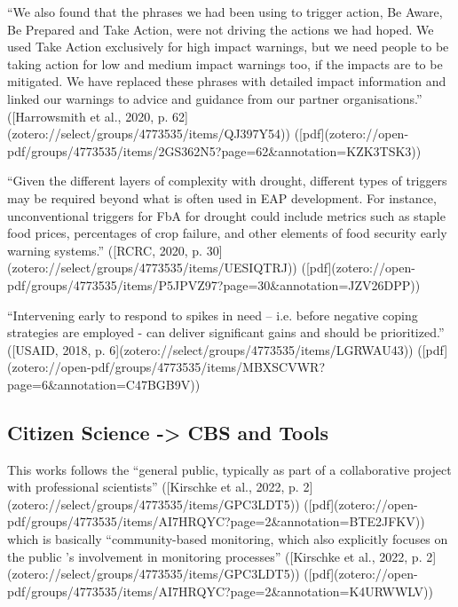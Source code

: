 “We also found that the phrases we had been using to trigger action, Be Aware, Be Prepared and Take Action, were not driving the actions we had hoped. We used Take Action exclusively for high impact warnings, but we need people to be taking action for low and medium impact warnings too, if the impacts are to be mitigated. We have replaced these phrases with detailed impact information and linked our warnings to advice and guidance from our partner organisations.” ([Harrowsmith et al., 2020, p. 62](zotero://select/groups/4773535/items/QJ397Y54)) ([pdf](zotero://open-pdf/groups/4773535/items/2GS362N5?page=62&annotation=KZK3TSK3))


“Given the different layers of complexity with drought, different types of triggers may be required beyond what is often used in EAP development. For instance, unconventional triggers for FbA for drought could include metrics such as staple food prices, percentages of crop failure, and other elements of food security early warning systems.” ([RCRC, 2020, p. 30](zotero://select/groups/4773535/items/UESIQTRJ)) ([pdf](zotero://open-pdf/groups/4773535/items/P5JPVZ97?page=30&annotation=JZV26DPP))

“Intervening early to respond to spikes in need – i.e. before negative coping strategies are employed - can deliver significant gains and should be prioritized.” ([USAID, 2018, p. 6](zotero://select/groups/4773535/items/LGRWAU43)) ([pdf](zotero://open-pdf/groups/4773535/items/MBXSCVWR?page=6&annotation=C47BGB9V))

\subsection{Citizen Science -> CBS and Tools}
This works follows the “general public, typically as part of a collaborative project with professional scientists” ([Kirschke et al., 2022, p. 2](zotero://select/groups/4773535/items/GPC3LDT5)) ([pdf](zotero://open-pdf/groups/4773535/items/AI7HRQYC?page=2&annotation=BTE2JFKV)) which is basically “community-based monitoring, which also explicitly focuses on the public ’s involvement in monitoring processes” ([Kirschke et al., 2022, p. 2](zotero://select/groups/4773535/items/GPC3LDT5)) ([pdf](zotero://open-pdf/groups/4773535/items/AI7HRQYC?page=2&annotation=K4URWWLV))

